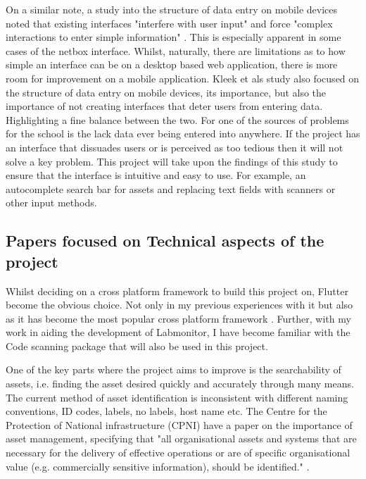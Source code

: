 \documentclass [12pt,letterpaper]{article}
\begin{document}
On a similar note, a study into the structure of data entry on mobile devices noted that existing interfaces "interfere with user input" and force "complex interactions to enter simple information" \cite{van2007gui}. This is especially apparent in some cases of the netbox interface. Whilst, naturally, there are limitations as to how simple an interface can be on a desktop based web application, there is more room for improvement on a mobile application. Kleek et als study also focused on the structure of data entry on mobile devices, its importance, but also the importance of not creating interfaces that deter users from entering data. Highlighting a fine balance between the two. For one of the sources of problems for the school is the lack data ever being entered into anywhere. If the project has an interface that dissuades users or is perceived as too tedious then it will not solve a key problem. This project will take upon the findings of this study to ensure that the interface is intuitive and easy to use. For example, an autocomplete search bar for assets and replacing text fields with scanners or other input methods. 

\subsection{Papers focused on Technical aspects of the project}
\label{sec:technical}

Whilst deciding on a cross platform framework to build this project on, Flutter become the obvious choice. Not only in my previous experiences with it but also as it has become the most popular cross platform framework \cite{JetBrainsFlutter}. Further, with my work in aiding the development of Labmonitor\cite{labmonitor}, I have become familiar with the Code scanning package that will also be used in this project.

One of the key parts where the project aims to improve is the searchability of assets, i.e. finding the asset desired quickly and accurately through many means. The current method of asset identification is inconsistent with different naming conventions, ID codes, labels, no labels, host name etc. The Centre for the Protection of National infrastructure (CPNI) have a paper on the importance of asset management, specifying that "all organisational assets and systems that are necessary for the delivery of effective operations or are of specific organisational value (e.g. commercially sensitive information), should be identified." \cite{cpni}.
\end{document}
